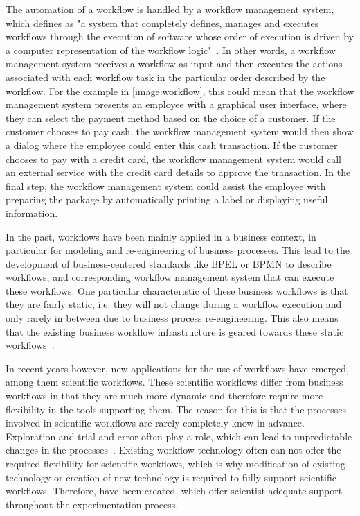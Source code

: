 The automation of a workflow is handled by a workflow management system, which \citeauthor*{workflow:referencemodel} defines as "a system that completely defines, manages and executes workflows through the execution of software whose order of execution is driven by a computer representation of the workflow logic"~\autocite{workflow:referencemodel}.
In other words, a workflow management system receives a workflow as input and then executes the actions associated with each workflow task in the particular order described by the workflow.
For the example in \autoref{image:workflow}, this could mean that the workflow management system presents an employee with a graphical user interface, where they can select the payment method based on the choice of a customer.
If the customer chooses to pay cash, the workflow management system would then show a dialog where the employee could enter this cash transaction.
If the customer chooses to pay with a credit card, the workflow management system would call an external service with the credit card details to approve the transaction.
In the final step, the workflow management system could assist the employee with preparing the package by automatically printing a label or displaying useful information.

In the past, workflows have been mainly applied in a business context, in particular for modeling and re-engineering of business processes.
This lead to the development of business-centered standards like BPEL or BPMN to describe workflows, and corresponding workflow management system that can execute these workflows.
One particular characteristic of these business workflows is that they are fairly static, i.e. they will not change during a workflow execution and only rarely in between due to business process re-engineering.
This also means that the existing business workflow infrastructure is geared towards these static workflows~\autocite{wasa}.

In recent years however, new applications for the use of workflows have emerged, among them scientific workflows.
These scientific workflows differ from business workflows in that they are much more dynamic and therefore require more flexibility in the tools supporting them.
The reason for this is that the processes involved in scientific workflows are rarely completely know in advance.
Exploration and trial and error often play a role, which can lead to unpredictable changes in the processes~\autocite{wasa}.
Existing workflow technology often can not offer the required flexibility for scientific workflows, which is why modification of existing technology or creation of new technology is required to fully support scientific workflows.
Therefore,  have been created, which offer scientist adequate support throughout the experimentation process.
